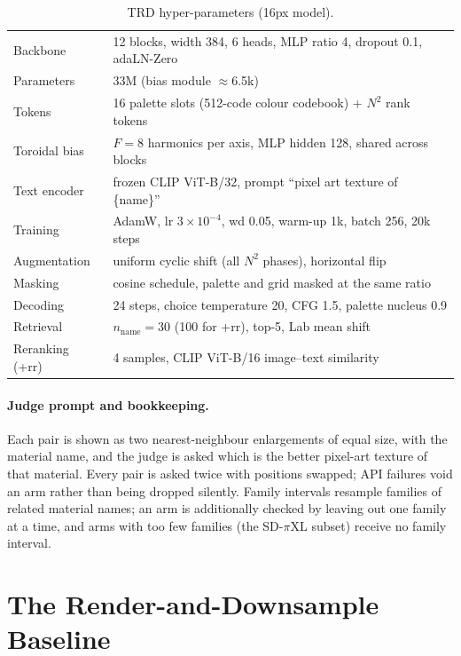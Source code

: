 \documentclass{article}
\newcommand{\trd}{\textsc{TRD}}
\begin{document}
\begin{table}[H]
\caption{\trd{} hyper-parameters (16px model).}
\label{tab:hparams}
\centering
\small
\begin{tabular}{@{}ll@{}}
\toprule
Backbone & 12 blocks, width 384, 6 heads, MLP ratio 4, dropout 0.1, adaLN-Zero \\
Parameters & 33M (bias module $\approx$6.5k) \\
Tokens & 16 palette slots (512-code colour codebook) + $N^2$ rank tokens \\
Toroidal bias & $F=8$ harmonics per axis, MLP hidden 128, shared across blocks \\
Text encoder & frozen CLIP ViT-B/32, prompt ``pixel art texture of \{name\}'' \\
Training & AdamW, lr $3\times10^{-4}$, wd 0.05, warm-up 1k, batch 256, 20k steps \\
Augmentation & uniform cyclic shift (all $N^2$ phases), horizontal flip \\
Masking & cosine schedule, palette and grid masked at the same ratio \\
Decoding & 24 steps, choice temperature 20, CFG 1.5, palette nucleus 0.9 \\
Retrieval & $n_\text{name}=30$ (100 for +rr), top-5, Lab mean shift \\
Reranking (+rr) & 4 samples, CLIP ViT-B/16 image--text similarity \\
\bottomrule
\end{tabular}
\end{table}

\paragraph{Judge prompt and bookkeeping.} Each pair is shown as two
nearest-neighbour enlargements of equal size, with the material name, and the
judge is asked which is the better pixel-art texture of that material. Every
pair is asked twice with positions swapped; API failures void an arm rather
than being dropped silently. Family intervals resample families of related
material names; an arm is additionally checked by leaving out one family at a
time, and arms with too few families (the SD-$\pi$XL subset) receive no family
interval.

\section{The Render-and-Downsample Baseline}
\end{document}
